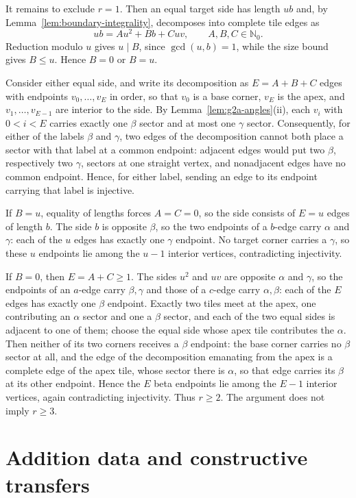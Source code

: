 \documentclass[11pt]{amsart}
\theoremstyle{definition}
\theoremstyle{remark}
\newcommand{\Nzero}{\mathbb N_0}
\begin{document}
It remains to exclude $r=1$.  Then an equal target side has length $ub$ and,
by Lemma~\ref{lem:boundary-integrality}, decomposes into complete tile edges
as
\[
             ub=A u^2+B b+Cuv,\qquad A,B,C\in\Nzero.
\]
Reduction modulo $u$ gives $u\mid B$, since $\gcd(u,b)=1$, while the size
bound gives $B\le u$.  Hence $B=0$ or $B=u$.

Consider either equal side, and write its decomposition as $E=A+B+C$ edges
with endpoints $v_0,\dots,v_E$ in order, so that $v_0$ is a base corner, $v_E$
is the apex, and $v_1,\dots,v_{E-1}$ are interior to the side.  By
Lemma~\ref{lem:g2a-angles}(ii), each $v_i$ with $0<i<E$ carries exactly one
$\beta$ sector and at most one $\gamma$ sector.  Consequently, for either of
the labels $\beta$ and $\gamma$, two edges of the decomposition cannot both
place a sector with that label at a common endpoint: adjacent edges would put
two $\beta$, respectively two $\gamma$, sectors at one straight vertex, and
nonadjacent edges have no common endpoint.  Hence, for either label, sending
an edge to its endpoint carrying that label is injective.

If $B=u$, equality of lengths forces $A=C=0$, so the side consists of $E=u$
edges of length $b$.  The side $b$ is opposite $\beta$, so the two endpoints
of a $b$-edge carry $\alpha$ and $\gamma$: each of the $u$ edges has exactly
one $\gamma$ endpoint.  No target corner carries a $\gamma$, so these $u$
endpoints lie among the $u-1$ interior vertices, contradicting injectivity.

If $B=0$, then $E=A+C\ge1$.  The sides $u^2$ and $uv$ are opposite $\alpha$
and $\gamma$, so the endpoints of an $a$-edge carry $\beta,\gamma$ and those
of a $c$-edge carry $\alpha,\beta$: each of the $E$ edges has exactly one
$\beta$ endpoint.  Exactly two tiles meet at the apex, one contributing an
$\alpha$ sector and one a $\beta$ sector, and each of the two equal sides is
adjacent to one of them; choose the equal side whose apex tile contributes the
$\alpha$.  Then neither of its two corners receives a $\beta$ endpoint: the
base corner carries no $\beta$ sector at all, and the edge of the
decomposition emanating from the apex is a complete edge of the apex tile,
whose sector there is $\alpha$, so that edge carries its $\beta$ at its other
endpoint.  Hence the $E$ beta endpoints lie among the $E-1$ interior vertices,
again contradicting injectivity.  Thus $r\ge2$.  The argument does not imply
$r\ge3$.

\section{Addition data and constructive transfers}\label{app:addition}
\end{document}
